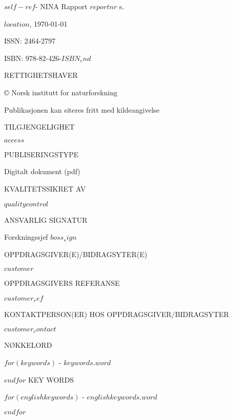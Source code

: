 \documentclass[11pt, a4paper]{article}
\newcommand{\smallspace}{\vspace{3mm}}
\begin{document}
\footnotesize{$self-ref$}- NINA Rapport $reportnr$ \pageref{LastPage} s. \par \smallspace
$location$, \ninadate\today \par \smallspace
ISSN: 2464-2797 \par
ISBN: 978-82-426-$ISBN_end$ \par  \smallspace
{\footnotesize{RETTIGHETSHAVER}} \par
© Norsk institutt for naturforskning  \par
Publikasjonen kan siteres fritt med kildeangivelse \par \smallspace
{\footnotesize{TILGJENGELIGHET}} \par
$access$ \par \smallspace
{\footnotesize{PUBLISERINGSTYPE}} \par
Digitalt dokument (pdf) \par \smallspace
{\footnotesize{KVALITETSSIKRET AV}} \par
$qualitycontrol$ \par \smallspace
{\footnotesize{ANSVARLIG SIGNATUR}} \par
Forskningssjef $boss_sign$ \par \smallspace
{\footnotesize{OPPDRAGSGIVER(E)/BIDRAGSYTER(E)}} \par
$customer$ \par \smallspace
{\footnotesize{OPPDRAGSGIVERS REFERANSE}} \par
$customer_ref$ \par \smallspace
{\footnotesize{KONTAKTPERSON(ER) HOS OPPDRAGSGIVER/BIDRAGSYTER}} \par
$customer_contact$ \par \smallspace
{\footnotesize{NØKKELORD}} \par\smallskip
$for(keywords)$
\small{\hyp{} $keywords.word$} \par
$endfor$
\vspace{5mm}
KEY WORDS \par\smallskip
$for(englishkeywords)$
\small{\hyp{} $englishkeywords.word$} \par
$endfor$

\vfill
\end{document}
